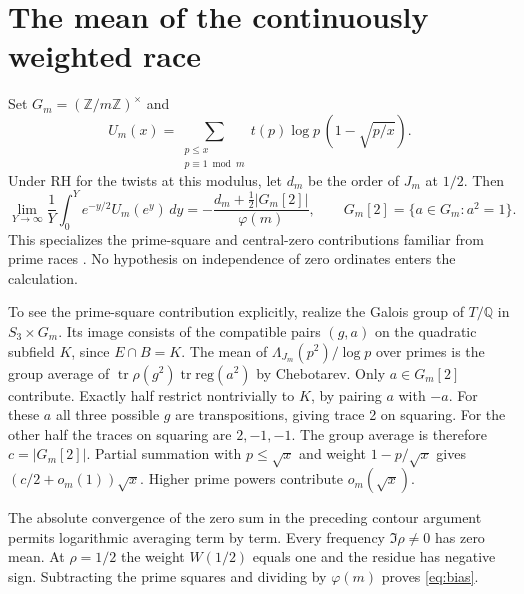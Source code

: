 \documentclass[11pt]{article}
\newcommand{\Q}{\mathbb Q}
\newcommand{\tr}{\operatorname{tr}}
\newcommand{\primesum}{\mathop{\sum}\limits}
\begin{document}
\section{The mean of the continuously weighted race}
Set $G_m=(\mathbb Z/m\mathbb Z)^\times$ and
\[
 U_m(x)=\primesum_{\substack{p\le x\\p\equiv1\bmod m}}
        t(p)\log p\,(1-\sqrt{p/x}).
\]
Under RH for the twists at this modulus, let $d_m$ be the order of $J_m$ at $1/2$. Then
\begin{equation}\label{eq:bias}
 \lim_{Y\to\infty}\frac1Y\int_0^Y e^{-y/2}U_m(e^y)\,dy
       =-\frac{d_m+\tfrac12|G_m[2]|}{\varphi(m)},\qquad
       G_m[2]=\{a\in G_m:a^2=1\}.
\end{equation}
This specializes the prime-square and central-zero contributions familiar from prime races \cite{devin}. No hypothesis on independence of zero ordinates enters the calculation.

To see the prime-square contribution explicitly, realize the Galois group of $T/\Q$ in $S_3\times G_m$. Its image consists of the compatible pairs $(g,a)$ on the quadratic subfield $K$, since $E\cap B=K$. The mean of $\Lambda_{J_m}(p^2)/\log p$ over primes is the group average of $\tr\rho(g^2)\tr\mathrm{reg}(a^2)$ by Chebotarev. Only $a\in G_m[2]$ contribute. Exactly half restrict nontrivially to $K$, by pairing $a$ with $-a$. For these $a$ all three possible $g$ are transpositions, giving trace 2 on squaring. For the other half the traces on squaring are $2,-1,-1$. The group average is therefore $c=|G_m[2]|$. Partial summation with $p\le\sqrt x$ and weight $1-p/\sqrt x$ gives $(c/2+o_m(1))\sqrt x$. Higher prime powers contribute $o_m(\sqrt x)$.

The absolute convergence of the zero sum in the preceding contour argument permits logarithmic averaging term by term. Every frequency $\Im\rho\ne0$ has zero mean. At $\rho=1/2$ the weight $W(1/2)$ equals one and the residue has negative sign. Subtracting the prime squares and dividing by $\varphi(m)$ proves \eqref{eq:bias}.
\end{document}
